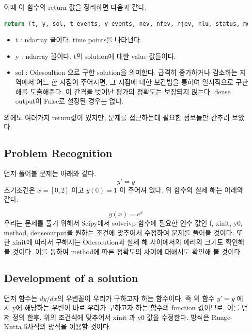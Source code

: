\documentclass[11pt]{article}
\begin{document}
이때 이 함수의 return 값을 정리하면 다음과 같다.
\begin{lstlisting}[language=Python]
return (t, y, sol, t_events, y_events, nev, nfev, njev, nlu, status, message, success)
\end{lstlisting}

\begin{itemize}
\item t : ndarray 꼴이다. time points를 나타낸다.
\item y : ndarray 꼴이다. t의 solution에 대한 value 값들이다.
\item sol : Odesoultion 으로 구한 solution을 의미한다. 급격히 증가하거나 감소하는 지역에서 어느 한 지점이 주어지면, 그 지점에 대한 보간법을 통하여 일시적으로 구한 해를 도출해준다. 이 간격을 벗어난 평가의 정확도는 보장되지 않는다. dense output이 False로 설정된 경우는 없다.
\end{itemize}
외에도 여러가지 return값이 있지만, 문제를 접근하는데 필요한 정보들만 간추려 보았다.









\subsection{Problem Recognition}
먼저 풀어볼 문제는 아래와 같다.
\begin{equation}
y' = y
\end{equation}
초기조건은 $x = [0, 2]$ 이고 $y(0) = 1$ 이 주어져 있다. 위 함수의 실제 해는 아래와 같다.

\begin{equation}
y(x) = e^{x}
\end{equation}
우리는 문제를 풀기 위해서  Scipy에서 solve\textunderscore ivp 함수에 필요한 인수 값인 f, xinit, y0, method, dense\textunderscore output을 원하는 조건에 맞추어서 수정하여 문제를 풀어볼 것이다. 또한 xinit에 따라서 구해지는 Odesolution과 실제 해 사이에서의 에러의 크기도 확인해 볼 것이다. 이를 통하여 method에 따른 정확도의 차이에 대해서도 확인해 볼 것이다.

\subsection{Development of a solution} 
먼저 함수는 $dy/dx$의 우변꼴이 우리가 구하고자 하는 함수이다. 즉 위 함수 $y' = y$ 에서 y에 해당하는 우변이 바로 우리가 구하고자 하는 함수의 function 값이므로, 이를 먼저 정의 한후, 위의 조건식에 맞추어서 xinit 과 y0 값을 수정한다. 방식은 Runge-Kutta 5차식의 방식을 이용할 것이다. 
\end{document}
